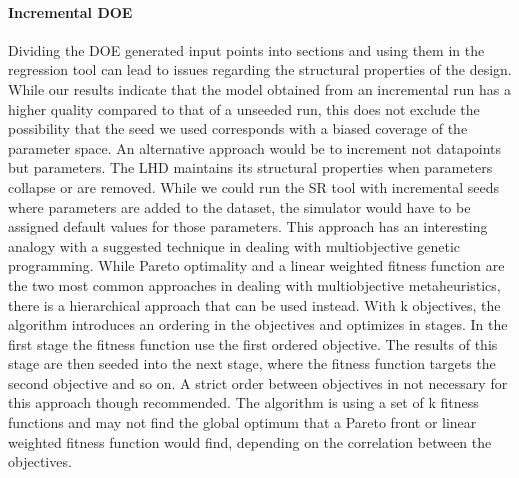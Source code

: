 \paragraph{Incremental DOE}
Dividing the DOE generated input points into sections and using them in the regression tool can lead to issues regarding the structural properties of the design. While our results indicate that the model obtained from an incremental run has a higher quality compared to that  of a unseeded run, this does not exclude the possibility that the seed we used corresponds with a biased coverage of the parameter space. An alternative approach would be to increment not datapoints but parameters. The LHD maintains its structural properties when parameters collapse or are removed. While we could run the SR tool with incremental seeds where parameters are added to the dataset, the simulator would have to be assigned default values for those parameters. This approach has an interesting analogy with a suggested technique in dealing with multiobjective genetic programming. While Pareto optimality and a linear weighted fitness function are the two most common approaches in dealing with multiobjective metaheuristics, there is a hierarchical approach that can be used instead. With k objectives, the algorithm introduces an ordering in the objectives and optimizes in stages. In the first stage the fitness function use the first ordered objective. The results of this stage are then seeded into the next stage, where the fitness function targets the second objective and so on. A strict order between objectives in not necessary for this approach though recommended. The algorithm is using a set of k fitness functions and may not find the global optimum that a Pareto front or linear weighted fitness function would find, depending on the correlation between the objectives.
